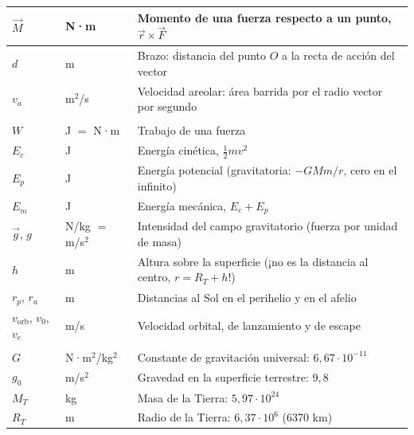 \documentclass[11pt,a4paper]{article}
\begin{document}
\begin{center}
\begin{tabular}{|>{\centering\arraybackslash}p{2.3cm}|>{\centering\arraybackslash}p{3cm}|>{\raggedright\arraybackslash}p{9.4cm}|}
$\vec M$ & N·m & Momento de una fuerza respecto a un punto, $\vec r\times\vec F$\\ \hline
$d$ & m & Brazo: distancia del punto $O$ a la recta de acción del vector\\ \hline
$v_a$ & m$^2$/s & Velocidad areolar: área barrida por el radio vector por segundo\\ \hline
\multicolumn{3}{|l|}{\textit{Energía y gravitación}}\\ \hline
$W$ & J $=$ N·m & Trabajo de una fuerza\\ \hline
$E_c$ & J & Energía cinética, $\tfrac12mv^2$\\ \hline
$E_p$ & J & Energía potencial (gravitatoria: $-GMm/r$, cero en el infinito)\\ \hline
$E_m$ & J & Energía mecánica, $E_c+E_p$\\ \hline
$\vec g$, $g$ & N/kg $=$ m/s$^2$ & Intensidad del campo gravitatorio (fuerza por unidad de masa)\\ \hline
$h$ & m & Altura sobre la superficie (¡no es la distancia al centro, $r=R_T+h$!)\\ \hline
$r_p$, $r_a$ & m & Distancias al Sol en el perihelio y en el afelio\\ \hline
$v_{\text{orb}}$, $v_0$, $v_e$ & m/s & Velocidad orbital, de lanzamiento y de escape\\ \hline
\multicolumn{3}{|l|}{\textit{Constantes}}\\ \hline
$G$ & N·m$^2$/kg$^2$ & Constante de gravitación universal: $6{,}67\cdot10^{-11}$\\ \hline
$g_0$ & m/s$^2$ & Gravedad en la superficie terrestre: $9{,}8$\\ \hline
$M_T$ & kg & Masa de la Tierra: $5{,}97\cdot10^{24}$\\ \hline
$R_T$ & m & Radio de la Tierra: $6{,}37\cdot10^{6}$ (6370 km)\\ \hline
\end{tabular}
\end{center}
\end{document}
